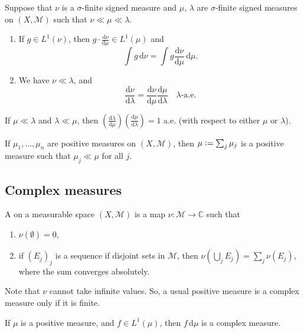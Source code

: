 \documentclass[12pt]{article}	%
\begin{document}
\begin{prop}
	Suppose that $\nu$ is a $\sigma$-finite signed measure and $\mu$, $\lambda$ are $\sigma$-finite signed measures on $(X, \mathcal{M})$ such that $\nu \ll \mu \ll \lambda$.
	\begin{enumerate}
		\item If $g \in L^{1}(\nu)$, then $g \cdot \frac{{\mathrm d} \nu}{{\mathrm d} \mu} \in L^{1}(\mu)$ and
		\begin{equation*} 
			\int g \,{\mathrm{d}}\nu = \int g \frac{{\mathrm d} \nu}{{\mathrm d} \mu} \,{\mathrm{d}}\mu.
		\end{equation*}
		\item We have $\nu \ll \lambda$, and
		\begin{equation*} 
			\frac{{\mathrm d} \nu}{{\mathrm d} \lambda} = \frac{{\mathrm d} \nu}{{\mathrm d} \mu}\frac{{\mathrm d} \mu}{{\mathrm d} \lambda} \quad \lambda \text{-a.e.}
		\end{equation*}
	\end{enumerate}
\end{prop}

\begin{cor}
	If $\mu \ll \lambda$ and $\lambda \ll \mu$, then $(\frac{{\mathrm d} \lambda}{{\mathrm d} \mu})(\frac{{\mathrm d} \mu}{{\mathrm d} \lambda}) = 1$ a.e. (with respect to either $\mu$ or $\lambda$).
\end{cor}

\begin{obs}
	If $\mu_{1}, \ldots, \mu_{n}$ are positive measures on $(X, \mathcal{M})$, then $\mu \vcentcolon= \sum_{j} \mu_{j}$ is a positive measure such that $\mu_{j} \ll \mu$ for all $j$.
\end{obs}

\subsection{Complex measures}

\begin{defn}
	A  on a measurable space $(X, \mathcal{M})$ is a map $\nu : \mathcal{M} \to \mathbb{C}$ such that
	\begin{enumerate}
		\item $\nu(\emptyset) = 0$,
		\item if $(E_{j})_{j}$ is a sequence if disjoint sets in $\mathcal{M}$, then $\nu(\bigcup_{j} E_{j}) = \sum_{j} \nu(E_{j})$, where the sum converges absolutely.
	\end{enumerate}
\end{defn}
Note that $\nu$ cannot take infinite values. So, a usual positive measure is a complex measure only if it is finite. 
\begin{ex}
	If $\mu$ is a positive measure, and $f \in L^{1}(\mu)$, then $f \,{\mathrm d}\mu$ is a complex measure.
\end{ex}
\end{document}
